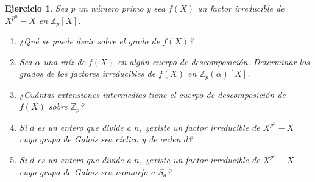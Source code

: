 \documentclass[11pt]{report}
\newcommand{\Z}{\mathbb Z}
\newtheorem{ejercicio}{Ejercicio}
\begin{document}
\begin{ejercicio}
    Sea $p$ un número primo y sea $f(X)$ un factor irreducible de $X^{p^n}-X$ en $\Z_p[X]$.
    \begin{enumerate}
        \item ¿Qué se puede decir sobre el grado de $f(X)$?
        \item Sea $\alpha$ una raíz de $f(X)$ en algún cuerpo de descomposición. Determinar los grados de los factores irreducibles de $f(X)$ en $\Z_p(\alpha)[X]$.
        \item ¿Cuántas extensiones intermedias tiene el cuerpo de descomposición de $f(X)$ sobre $\Z_p$?
        \item Si $d$ es un entero que divide a $n$, ¿existe un factor irreducible de $X^{p^n}-X$ cuyo grupo de Galois sea cíclico y de orden $d$?
        \item Si $d$ es un entero que divide a $n$, ¿existe un factor irreducible de $X^{p^n}-X$ cuyo grupo de Galois sea isomorfo a $S_d$?
    \end{enumerate}
\end{ejercicio}
\end{document}

